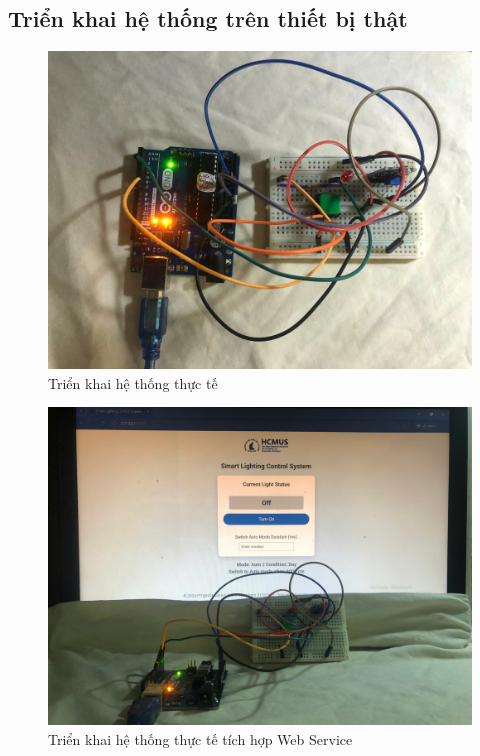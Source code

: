 \subsection{Triển khai hệ thống trên thiết bị thật}
\begin{figure}[H]
    \centering
    \includegraphics[scale=0.12]{img/realSystem.jpg}
    \caption{Triển khai hệ thống thực tế}
    \label{fig:my_label}
\end{figure}

\begin{figure}[H]
    \centering
    \includegraphics[scale=0.12]{img/SystemWeb.jpg}
    \caption{Triển khai hệ thống thực tế tích hợp Web Service}
    \label{fig:my_label}
\end{figure}

